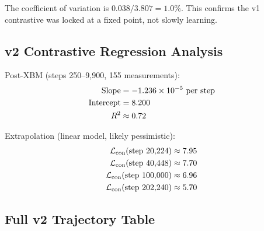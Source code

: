 \documentclass[11pt,a4paper]{article}
\newcommand{\loss}{\mathcal{L}}
\begin{document}
The coefficient of variation is $0.038 / 3.807 = 1.0\%$. This confirms the v1
contrastive was locked at a fixed point, not slowly learning.

\subsection{v2 Contrastive Regression Analysis}

Post-XBM (steps 250--9{,}900, 155 measurements):
\begin{align}
\text{Slope} &= -1.236 \times 10^{-5} \text{ per step} \notag \\
\text{Intercept} &= 8.200 \notag \\
R^2 &\approx 0.72 \notag
\end{align}

Extrapolation (linear model, likely pessimistic):
\begin{align}
\loss_{\text{con}}(\text{step } 20{,}224) &\approx 7.95 \notag \\
\loss_{\text{con}}(\text{step } 40{,}448) &\approx 7.70 \notag \\
\loss_{\text{con}}(\text{step } 100{,}000) &\approx 6.96 \notag \\
\loss_{\text{con}}(\text{step } 202{,}240) &\approx 5.70 \notag
\end{align}

\subsection{Full v2 Trajectory Table}
\end{document}

